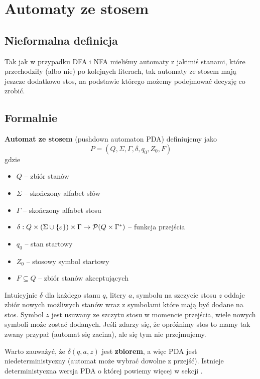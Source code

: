\section{Automaty ze stosem}

\subsection{Nieformalna definicja}
Tak jak w przypadku DFA i NFA mieliśmy automaty z jakimiś stanami, które przechodziły (albo nie) po kolejnych literach, tak automaty ze stosem mają jeszcze dodatkowo stos, na podstawie którego możemy podejmować decyzję co zrobić.

\subsection{Formalnie}
\begin{definition}
	\textbf{Automat ze stosem} (pushdown automaton PDA) definiujemy jako
	\[
		P = (Q, \Sigma, \Gamma, \delta, q_0, Z_0, F)
	\]
	gdzie
	\begin{itemize}
		\item \( Q \) -- zbiór stanów
		\item \( \Sigma \) -- skończony alfabet słów
		\item \( \Gamma \) -- skończony alfabet stosu
		\item \( \delta : Q \times (\Sigma \cup \set{\eps}) \times \Gamma \rightarrow \powerset\pars{Q \times \Gamma^*} \) -- funkcja przejścia
		\item \( q_0 \) -- stan startowy
		\item \( Z_0\) -- stosowy symbol startowy
		\item \( F \subseteq Q \) -- zbiór stanów akceptujących
	\end{itemize}
\end{definition}
Intuicyjnie \( \delta \) dla każdego stanu \( q \), litery \( a \), symbolu na szczycie stosu \( z \) oddaje zbiór nowych możliwych stanów wraz z symbolami które mają być dodane na stos.
Symbol \( z \) jest usuwany ze szczytu stosu w momencie przejścia, wiele nowych symboli może zostać dodanych.
Jeśli zdarzy się, że opróżnimy stos to mamy tak zwany przypał (automat się zacina), ale się tym nie przejmujemy.

Warto zauważyć, że \( \delta(q, a, z) \) jest \textbf{zbiorem}, a więc PDA jest niedeterministyczny (automat może wybrać dowolne z przejść).
Istnieje deterministyczna wersja PDA o której powiemy więcej w sekcji .


